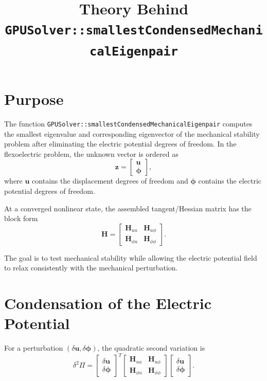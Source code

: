 \documentclass[11pt]{article}
\title{Theory Behind \texttt{GPUSolver::smallestCondensedMechanicalEigenpair}}
\author{}
\date{}
\begin{document}
\maketitle

\section{Purpose}

The function \texttt{GPUSolver::smallestCondensedMechanicalEigenpair}
computes the smallest eigenvalue and corresponding eigenvector of the
mechanical stability problem after eliminating the electric potential
degrees of freedom. In the flexoelectric problem, the unknown vector is
ordered as
\[
    \bm z =
    \begin{bmatrix}
        \bm u \\
        \bm \phi
    \end{bmatrix},
\]
where \(\bm u\) contains the displacement degrees of freedom and
\(\bm \phi\) contains the electric potential degrees of freedom.

At a converged nonlinear state, the assembled tangent/Hessian matrix has
the block form
\[
    \bm H =
    \begin{bmatrix}
        \bm H_{uu} & \bm H_{u\phi} \\
        \bm H_{\phi u} & \bm H_{\phi\phi}
    \end{bmatrix}.
\]

The goal is to test mechanical stability while allowing the electric
potential field to relax consistently with the mechanical perturbation.

\section{Condensation of the Electric Potential}

For a perturbation \((\delta \bm u, \delta \bm \phi)\), the quadratic
second variation is
\[
    \delta^2 \Pi =
    \begin{bmatrix}
        \delta \bm u \\
        \delta \bm \phi
    \end{bmatrix}^{T}
    \begin{bmatrix}
        \bm H_{uu} & \bm H_{u\phi} \\
        \bm H_{\phi u} & \bm H_{\phi\phi}
    \end{bmatrix}
    \begin{bmatrix}
        \delta \bm u \\
        \delta \bm \phi
    \end{bmatrix}.
\]
\end{document}
